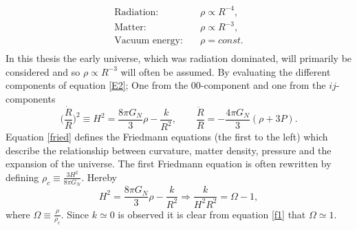 \begin{equation}
	\begin{split}
		\text{Radiation:} \quad &\rho\propto R^{-4},\\
		\text{Matter:} \quad &\rho\propto R^{-3},\\
		\text{Vacuum energy:} \quad &\rho=const.\\
	\end{split}
\end{equation}  
In this thesis the early universe, which was radiation dominated, will primarily be considered and so $\rho\propto R^{-3}$ will often be assumed. By evaluating the different components of equation \eqref{E2}; One from the $00$-component and one from the $ij$-components
\begin{equation}
	\bigg(\frac{\dot{R}}{R}\bigg)^2\equiv H^2=\frac{8\pi G_N}{3}\rho-\frac{k}{R^2}, \qquad \frac{\ddot{R}}{R}=-\frac{4\pi G_N}{3}(\rho+3P).
	\label{fried}
\end{equation} 
Equation \eqref{fried} defines the Friedmann equations (the first to the left) which describe the relationship between curvature, matter density, pressure and the expansion of the universe. The first Friedmann equation is often rewritten by defining $\rho_c\equiv \frac{3H^2}{8\pi G_N}$. Hereby
\begin{equation}
	H^2=\frac{8\pi G_N}{3}\rho-\frac{k}{R^2}\Rightarrow \frac{k}{H^2R^2}=\Omega-1,
	\label{f1}
\end{equation} 
where $\Omega\equiv \frac{\rho}{\rho_c}$. Since $k\simeq 0$ is observed it is clear from equation \eqref{f1} that $\Omega\simeq 1$.